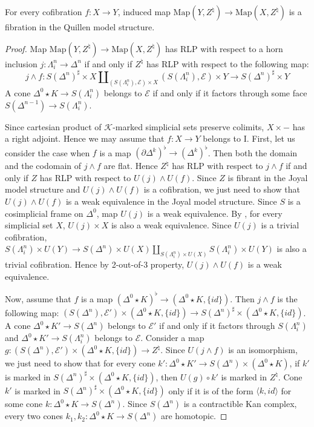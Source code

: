 \documentclass[reqno]{amsart}
\theoremstyle{definition}
\theoremstyle{remark}
\newcommand{\K}{$\mathcal{K}$}
\newcommand{\join}{\star}
\newcommand{\Map}{\mathrm{Map}}
\newcommand{\I}{\mathrm{I}}
\numberwithin{figure}{section}
\begin{document}
\begin{prop}
For every cofibration $f : X \to Y$, induced map $\Map(Y,Z^\natural) \to \Map(X,Z^\natural)$ is a fibration in the Quillen model structure.
\end{prop}
\begin{proof}
Map $\Map(Y,Z^\natural) \to \Map(X,Z^\natural)$ has RLP with respect to a horn inclusion
$j : \Lambda^n_i \to \Delta^n$ if and only if $Z^\natural$ has RLP with respect to the following map:
\[ j \wedge f : S(\Delta^n)^\sharp \times X \amalg_{(S(\Lambda^n_i),\mathcal{E}) \times X} (S(\Lambda^n_i),\mathcal{E}) \times Y \to S(\Delta^n)^\sharp \times Y \]
A cone $\Delta^0 \join K \to S(\Lambda^n_i)$ belongs to $\mathcal{E}$ if and only if it factors through some face $S(\Delta^{n-1}) \to S(\Lambda^n_i)$.

Since cartesian product of \K-marked simplicial sets preserve colimits, $X \times -$ has a right adjoint.
Hence we may assume that $f : X \to Y$ belongs to $\I$.
First, let us consider the case when $f$ is a map $(\partial \Delta^k)^\flat \to (\Delta^k)^\flat$.
Then both the domain and the codomain of $j \wedge f$ are flat.
Hence $Z^\natural$ has RLP with respect to $j \wedge f$ if and only if $Z$ has RLP with respect to $U(j) \wedge U(f)$.
Since $Z$ is fibrant in the Joyal model structure and $U(j) \wedge U(f)$ is a cofibration,
we just need to show that $U(j) \wedge U(f)$ is a weak equivalence in the Joyal model structure.
Since $S$ is a cosimplicial frame on $\Delta^0$, map $U(j)$ is a weak equivalence.
By \cite[Corollary~2.2.5.4]{lurie-topos}, for every simplicial set $X$, $U(j) \times X$ is also a weak equivalence.
Since $U(j)$ is a trivial cofibration, $S(\Lambda^n_i) \times U(Y) \to S(\Delta^n) \times U(X) \amalg_{S(\Lambda^n_i) \times U(X)} S(\Lambda^n_i) \times U(Y)$ is also a trivial cofibration.
Hence by 2-out-of-3 property, $U(j) \wedge U(f)$ is a weak equivalence.

Now, assume that $f$ is a map $(\Delta^0 \join K)^\flat \to (\Delta^0 \join K, \{ id \})$.
Then $j \wedge f$ is the following map: $(S(\Delta^n),\mathcal{E}') \times (\Delta^0 \join K, \{ id \}) \to S(\Delta^n)^\sharp \times (\Delta^0 \join K, \{ id \})$.
A cone $\Delta^0 \join K' \to S(\Delta^n)$ belongs to $\mathcal{E}'$ if and only if
it factors through $S(\Lambda^n_i)$ and $\Delta^0 \join K' \to S(\Lambda^n_i)$ belongs to $\mathcal{E}$.
Consider a map $g : (S(\Delta^n),\mathcal{E}') \times (\Delta^0 \join K, \{ id \}) \to Z^\natural$.
Since $U(j \wedge f)$ is an isomorphism, we just need to show that for every cone $k' : \Delta^0 \join K' \to S(\Delta^n) \times (\Delta^0 \join K)$,
if $k'$ is marked in $S(\Delta^n)^\sharp \times (\Delta^0 \join K, \{ id \})$, then $U(g) \circ k'$ is marked in $Z^\natural$.
Cone $k'$ is marked in $S(\Delta^n)^\sharp \times (\Delta^0 \join K, \{ id \})$ only if it is of the form $\langle k, id \rangle$ for some cone $k : \Delta^0 \join K \to S(\Delta^n)$.
Since $S(\Delta^n)$ is a contractible Kan complex, every two cones $k_1,k_2 : \Delta^0 \join K \to S(\Delta^n)$ are homotopic.


\end{proof}
\end{document}
